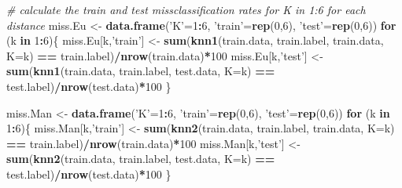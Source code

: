 \documentclass[
]{article}
\newenvironment{Shaded}{\begin{snugshade}}{\end{snugshade}}
\newcommand{\CommentTok}[1]{\textcolor[rgb]{0.56,0.35,0.01}{\textit{#1}}}
\newcommand{\ControlFlowTok}[1]{\textcolor[rgb]{0.13,0.29,0.53}{\textbf{#1}}}
\newcommand{\DataTypeTok}[1]{\textcolor[rgb]{0.13,0.29,0.53}{#1}}
\newcommand{\DecValTok}[1]{\textcolor[rgb]{0.00,0.00,0.81}{#1}}
\newcommand{\KeywordTok}[1]{\textcolor[rgb]{0.13,0.29,0.53}{\textbf{#1}}}
\newcommand{\NormalTok}[1]{#1}
\newcommand{\OperatorTok}[1]{\textcolor[rgb]{0.81,0.36,0.00}{\textbf{#1}}}
\newcommand{\StringTok}[1]{\textcolor[rgb]{0.31,0.60,0.02}{#1}}
\begin{document}
\begin{Shaded}
\begin{Highlighting}[]
\CommentTok{# calculate the train and test missclassification rates for K in 1:6 for each distance }
\NormalTok{miss.Eu <-}\StringTok{ }\KeywordTok{data.frame}\NormalTok{(}\StringTok{'K'}\NormalTok{=}\DecValTok{1}\OperatorTok{:}\DecValTok{6}\NormalTok{, }\StringTok{'train'}\NormalTok{=}\KeywordTok{rep}\NormalTok{(}\DecValTok{0}\NormalTok{,}\DecValTok{6}\NormalTok{), }\StringTok{'test'}\NormalTok{=}\KeywordTok{rep}\NormalTok{(}\DecValTok{0}\NormalTok{,}\DecValTok{6}\NormalTok{))}
\ControlFlowTok{for}\NormalTok{ (k }\ControlFlowTok{in} \DecValTok{1}\OperatorTok{:}\DecValTok{6}\NormalTok{)\{}
\NormalTok{    miss.Eu[k,}\StringTok{'train'}\NormalTok{] <-}\StringTok{ }\KeywordTok{sum}\NormalTok{(}\KeywordTok{knn1}\NormalTok{(train.data, train.label, train.data, }\DataTypeTok{K=}\NormalTok{k) }\OperatorTok{==}\StringTok{ }\NormalTok{train.label)}\OperatorTok{/}\KeywordTok{nrow}\NormalTok{(train.data)}\OperatorTok{*}\DecValTok{100}
\NormalTok{    miss.Eu[k,}\StringTok{'test'}\NormalTok{] <-}\StringTok{  }\KeywordTok{sum}\NormalTok{(}\KeywordTok{knn1}\NormalTok{(train.data, train.label, test.data, }\DataTypeTok{K=}\NormalTok{k)  }\OperatorTok{==}\StringTok{ }\NormalTok{test.label)}\OperatorTok{/}\KeywordTok{nrow}\NormalTok{(test.data)}\OperatorTok{*}\DecValTok{100}
\NormalTok{\}}


\NormalTok{miss.Man <-}\StringTok{ }\KeywordTok{data.frame}\NormalTok{(}\StringTok{'K'}\NormalTok{=}\DecValTok{1}\OperatorTok{:}\DecValTok{6}\NormalTok{, }\StringTok{'train'}\NormalTok{=}\KeywordTok{rep}\NormalTok{(}\DecValTok{0}\NormalTok{,}\DecValTok{6}\NormalTok{), }\StringTok{'test'}\NormalTok{=}\KeywordTok{rep}\NormalTok{(}\DecValTok{0}\NormalTok{,}\DecValTok{6}\NormalTok{))}
\ControlFlowTok{for}\NormalTok{ (k }\ControlFlowTok{in} \DecValTok{1}\OperatorTok{:}\DecValTok{6}\NormalTok{)\{}
\NormalTok{    miss.Man[k,}\StringTok{'train'}\NormalTok{] <-}\StringTok{ }\KeywordTok{sum}\NormalTok{(}\KeywordTok{knn2}\NormalTok{(train.data, train.label, train.data, }\DataTypeTok{K=}\NormalTok{k) }\OperatorTok{==}\StringTok{ }\NormalTok{train.label)}\OperatorTok{/}\KeywordTok{nrow}\NormalTok{(train.data)}\OperatorTok{*}\DecValTok{100}
\NormalTok{    miss.Man[k,}\StringTok{'test'}\NormalTok{] <-}\StringTok{  }\KeywordTok{sum}\NormalTok{(}\KeywordTok{knn2}\NormalTok{(train.data, train.label, test.data, }\DataTypeTok{K=}\NormalTok{k)  }\OperatorTok{==}\StringTok{ }\NormalTok{test.label)}\OperatorTok{/}\KeywordTok{nrow}\NormalTok{(test.data)}\OperatorTok{*}\DecValTok{100}
\NormalTok{\}}


\end{Highlighting}
\end{Shaded}
\end{document}

